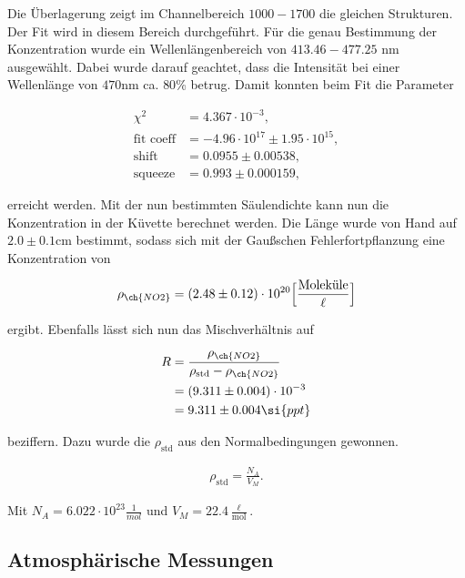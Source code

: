 \documentclass[12pt, a4paper, bibliography=totoc]{scrartcl}
\begin{document}
\begin{multicols}{2}
Die Überlagerung zeigt im Channelbereich $1000-1700$ die gleichen Strukturen. Der Fit wird in diesem Bereich durchgeführt.
Für die genau Bestimmung der  Konzentration wurde ein Wellenlängenbereich von $413.46 - 477.25$ \si{nm} ausgewählt.
Dabei wurde darauf geachtet, dass die Intensität bei einer Wellenlänge von $470$\si{nm} ca. $80$\% betrug.
Damit konnten beim Fit die Parameter

\begin{align}
	\chi^2 &= 4.367 \cdot 10^{-3},\\
    \text{fit coeff} &= -4.96 \cdot 10^{17} \pm 1.95 \cdot 10^{15},\\
    \text{shift} &= 0.0955 \pm 0.00538,\\
    \text{squeeze} &= 0.993 \pm 0.000159, 
\end{align}

erreicht werden.
Mit der nun bestimmten Säulendichte kann nun die  Konzentration in der Küvette berechnet werden.
Die Länge wurde von Hand auf $2.0 \pm 0.1$\si{cm} bestimmt, sodass sich mit der Gaußschen Fehlerfortpflanzung eine Konzentration von

\begin{align}
    \rho_{\ch{NO2}} = (2.48 \pm 0.12) \cdot 10^{20} \Bigl[ \frac{\text{Moleküle}}{\ell}\Bigr]
\end{align}

ergibt.	
Ebenfalls lässt sich nun das Mischverhältnis auf

\begin{align}
    R &= \frac{\rho_{\ch{NO2}}}{\rho_{\text{std}}-\rho_{\ch{NO2}}}\\ 
    &= (9.311 \pm 0.004) \cdot 10^{-3}\\
    &= 9.311 \pm 0.004 \si{ppt}
\end{align}

beziffern. Dazu wurde die $\rho_{\text{std}}$ aus den Normalbedingungen gewonnen.

\begin{align}
    \rho_{\text{std}} = \frac{N_A}{V_M}.
\end{align}
 	
Mit $N_A = 6.022 \cdot 10^{23} \frac{1}{\si{mol}}$ und $V_M = 22.4 \frac{\ell}{\si{\mol}}$.

\subsection{Atmosphärische Messungen}\label{ssec:atmospheric_measurements}


\end{multicols}
\end{document}
